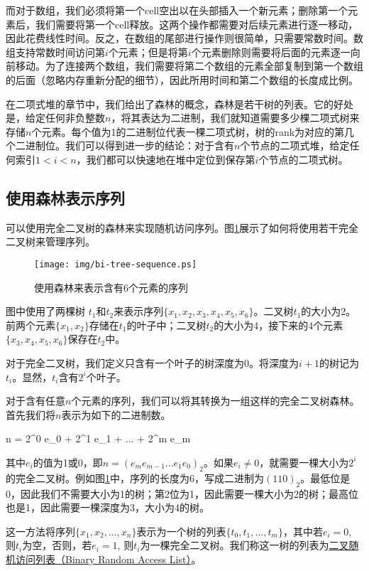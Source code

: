 \documentclass[UTF8]{article}
\begin{document}
而对于数组，我们必须将第一个cell空出以在头部插入一个新元素；删除第一个元素后，我们需要将第一个cell释放。这两个操作都需要对后续元素进行逐一移动，因此花费线性时间。反之，在数组的尾部进行操作则很简单，只需要常数时间。数组支持常数时间访问第$i$个元素；但是将第$i$个元素删除则需要将后面的元素逐一向前移动。为了连接两个数组，我们需要将第二个数组的元素全部复制到第一个数组的后面（忽略内存重新分配的细节），因此所用时间和第二个数组的长度成比例。

在二项式堆的章节中，我们给出了森林的概念，森林是若干树的列表。它的好处是，给定任何非负整数$n$，将其表达为二进制，我们就知道需要多少棵二项式树来存储$n$个元素。每个值为1的二进制位代表一棵二项式树，树的rank为对应的第几个二进制位。我们可以得到进一步的结论：对于含有$n$个节点的二项式堆，给定任何索引$1 < i < n$，我们都可以快速地在堆中定位到保存第$i$个节点的二项式树。

\subsection{使用森林表示序列}

可以使用完全二叉树的森林来实现随机访问序列。图\ref{fig:bi-tree-sequence}展示了如何将使用若干完全二叉树来管理序列。

\begin{figure}[htbp]
  \centering
  \texttt{[image: img/bi-tree-sequence.ps]}
  \caption{使用森林来表示含有6个元素的序列} \label{fig:bi-tree-sequence}
\end{figure}

图中使用了两棵树 $t_1$和$t_2$来表示序列$\{x_1, x_2, x_3, x_4, x_5, x_6\}$。二叉树$t_1$的大小为2。前两个元素$\{x_1, x_2\}$存储在$t_1$的叶子中；二叉树$t_2$的大小为4，接下来的4个元素$\{x_3, x_4, x_5, x_6\}$保存在$t_2$中。

对于完全二叉树，我们定义只含有一个叶子的树深度为0。将深度为$i+1$的树记为$t_i$。显然，$t_i$含有$2^i$个叶子。

对于含有任意$n$个元素的序列，我们可以将其转换为一组这样的完全二叉树森林。首先我们将$n$表示为如下的二进制数。

\be
n = 2^0 e_0 + 2^1 e_1 + ... + 2^m e_m
\ee

其中$e_i$的值为1或0，即$n=(e_m e_{m-1} ... e_1 e_0)_2$。如果$e_i \neq 0$，就需要一棵大小为$2^i$的完全二叉树。例如图\ref{fig:bi-tree-sequence}中，序列的长度为6，写成二进制为$(110)_2$。最低位是0，因此我们不需要大小为1的树；第2位为1，因此需要一棵大小为2的树；最高位也是1，因此需要一棵深度为3，大小为4的树。

这一方法将序列$\{x_1, x_2, ..., x_n\}$表示为一个树的列表$\{t_0, t_1, ..., t_m\}$，其中若$e_i = 0$, 则$t_i$为空，否则，若$e_i = 1$, 则$t_i$为一棵完全二叉树。我们称这一树的列表为\underline{二叉随机访问列表（Binary Random Access List）}\cite{okasaki-book}。
\end{document}
